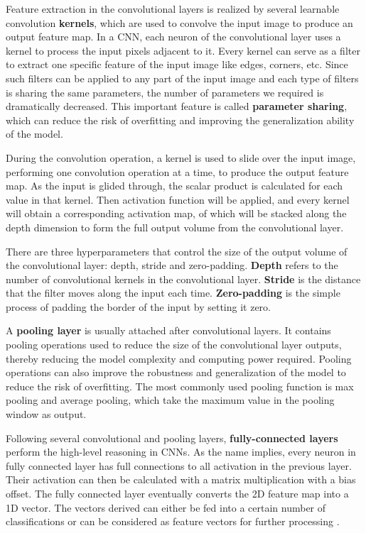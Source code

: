 Feature extraction in the convolutional layers is realized by several learnable convolution \textbf{kernels}, which are used to convolve the input image to produce an output feature map. In a CNN, each neuron of the convolutional layer uses a kernel to process the input pixels adjacent to it. Every kernel can serve as a filter to extract one specific feature of the input image like edges, corners, etc. Since such filters can be applied to any part of the input image and each type of filters is sharing the same parameters, the number of parameters we required is dramatically decreased. This important feature is called \textbf{parameter sharing}, which can reduce the risk of overfitting and improving the generalization ability of the model. 

During the convolution operation, a kernel is used to slide over the input image, performing one convolution operation at a time, to produce the output feature map. As the input is glided through, the scalar product is calculated for each value in that kernel. Then activation function will be applied, and every kernel will obtain a corresponding activation map, of which will be stacked along the depth dimension to form the full output volume from the convolutional layer.

There are three hyperparameters that control the size of the output volume of the convolutional layer: depth, stride and zero-padding. \textbf{Depth} refers to the number of convolutional kernels in the convolutional layer. \textbf{Stride} is the distance that the filter moves along the input each time. \textbf{Zero-padding} is the simple process of padding the border of the input by setting it zero.

A \textbf{pooling layer} is usually attached after convolutional layers. It contains pooling operations used to reduce the size of the convolutional layer outputs, thereby reducing the model complexity and computing power required. Pooling operations can also improve the robustness and generalization of the model to reduce the risk of overfitting. The most commonly used pooling function is max pooling and average pooling, which take the maximum value in the pooling window as output.

Following several convolutional and pooling layers, \textbf{fully-connected layers} perform the high-level reasoning in CNNs. As the name implies, every neuron in fully connected layer has full connections to all activation in the previous layer. Their activation can then be calculated with a matrix multiplication with a bias offset. The fully connected layer eventually converts the 2D feature map into a 1D vector. The vectors derived can either be fed into a certain number of classifications or can be considered as feature vectors for further processing \cite{voulodimos_deep_2018}. 

